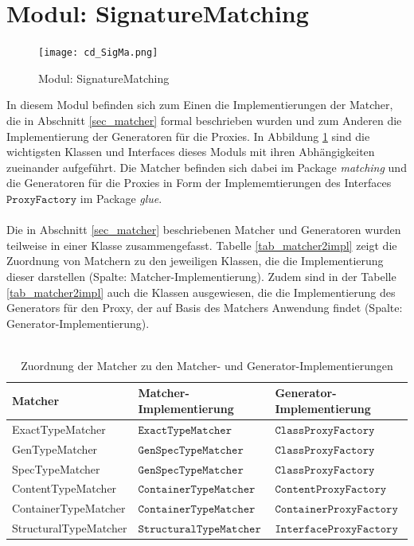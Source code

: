 \section{Modul: SignatureMatching}\label{impl_sigma}
\begin{figure}[h!]
\texttt{[image: cd\_SigMa.png]}
\caption{Modul: SignatureMatching}
\label{fig_cdSigMa}
\end{figure}
\noindent
In diesem Modul befinden sich zum Einen die Implementierungen der Matcher, die in Abschnitt \ref{sec_matcher} formal beschrieben wurden und zum Anderen die Implementierung der Generatoren für die Proxies. In Abbildung \ref{fig_cdSigMa} sind die wichtigsten Klassen und Interfaces dieses Moduls mit ihren Abhängigkeiten zueinander aufgeführt. Die Matcher befinden sich dabei im Package \emph{matching} und die Generatoren für die Proxies in Form der Implememtierungen des Interfaces $\texttt{ProxyFactory}$ im Package \emph{glue}.
\\\\
Die in Abschnitt \ref{sec_matcher} beschriebenen Matcher und Generatoren wurden teilweise in einer Klasse zusammengefasst. Tabelle \ref{tab_matcher2impl} zeigt die Zuordnung von Matchern zu den jeweiligen Klassen, die die Implementierung dieser darstellen (Spalte: Matcher-Implementierung). Zudem sind in der Tabelle \ref{tab_matcher2impl} auch die Klassen ausgewiesen, die die Implementierung des Generators für den Proxy, der auf Basis des Matchers Anwendung findet (Spalte: Generator-Implementierung).
\\\\
\begin{table}[h!]
\centering
\begin{tabular}{|l|l|l|}
\hline
\hline
\textbf{Matcher} & \textbf{Matcher-Implementierung} & \textbf{Generator-Implementierung}\\
\hline
ExactTypeMatcher & $\texttt{ExactTypeMatcher}$ & $\texttt{ClassProxyFactory}$ \\
\hline
GenTypeMatcher & $\texttt{GenSpecTypeMatcher}$ & $\texttt{ClassProxyFactory}$\\
\hline
SpecTypeMatcher & $\texttt{GenSpecTypeMatcher}$ & $\texttt{ClassProxyFactory}$\\
\hline
ContentTypeMatcher & $\texttt{ContainerTypeMatcher}$ & $\texttt{ContentProxyFactory}$\\
\hline
ContainerTypeMatcher & $\texttt{ContainerTypeMatcher}$ & $\texttt{ContainerProxyFactory}$\\
\hline
StructuralTypeMatcher & $\texttt{StructuralTypeMatcher}$ & $\texttt{InterfaceProxyFactory}$\\
\hline
\hline
\end{tabular}
\caption{Zuordnung der Matcher zu den Matcher- und Generator-Implementierungen}
\end{table}\label{tab_matcher2impl}
